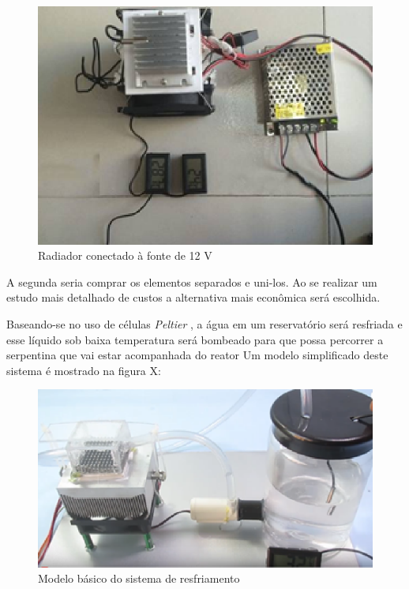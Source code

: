 \begin{figure}[h]
	\centering
	\includegraphics[keepaspectratio=true,scale=0.6]{figuras/radiador2.eps}
	\caption{Radiador conectado à fonte de 12 V}
	\label{radiador2}
\end{figure}

A segunda seria comprar os elementos separados e uni-los. Ao se realizar um estudo mais detalhado de custos a alternativa mais econômica será escolhida.

Baseando-se no uso de células \textit{Peltier} , a água em um reservatório será resfriada e esse líquido sob baixa temperatura será bombeado para que possa percorrer a serpentina que vai estar acompanhada do reator Um modelo simplificado deste sistema é mostrado na figura X:

\begin{figure}[h]
	\centering
	\includegraphics[keepaspectratio=true,scale=0.5]{figuras/resfriamento.eps}
	\caption{Modelo básico do sistema de resfriamento}
	\label{resfriamento}
\end{figure}

